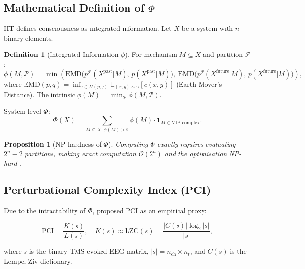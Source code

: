 \documentclass[12pt,a4paper]{article}
\theoremstyle{plain}
\newtheorem{proposition}[theorem]{Proposition}
\theoremstyle{definition}
\newtheorem{definition}[theorem]{Definition}
\theoremstyle{remark}
\newcommand{\PCI}{\mathrm{PCI}}
\newcommand{\E}{\mathbb{E}}
\begin{document}
\subsection{Mathematical Definition of \texorpdfstring{$\Phi$}{Phi}}

IIT \citep{Tononi2004,Tononi2016} defines consciousness as integrated information.
Let $X$ be a system with $n$ binary elements.

\begin{definition}[Integrated Information $\phi$]
For mechanism $M\subseteq X$ and partition $\mathcal{P}$:
\begin{equation}
\phi(M,\mathcal{P}) = \min\!\left(
  \mathrm{EMD}\bigl(p^\mathcal{P}(X^\mathrm{past}|M),\,p(X^\mathrm{past}|M)\bigr),\;
  \mathrm{EMD}\bigl(p^\mathcal{P}(X^\mathrm{future}|M),\,p(X^\mathrm{future}|M)\bigr)
\right),
\label{eq:phi}
\end{equation}
where $\mathrm{EMD}(p,q) = \inf_{\gamma\in\Pi(p,q)}\E_{(x,y)\sim\gamma}[c(x,y)]$
(Earth Mover's Distance). The intrinsic $\phi(M) = \min_\mathcal{P}\phi(M,\mathcal{P})$.

\noindent System-level $\Phi$:
\begin{equation}
\Phi(X) = \sum_{M\subseteq X,\,\phi(M)>0}\phi(M)\cdot\mathbf{1}_{M\in\text{MIP-complex}}.
\label{eq:Phi}
\end{equation}
\end{definition}

\begin{proposition}[NP-hardness of $\Phi$]
Computing $\Phi$ exactly requires evaluating $2^n-2$ partitions, making exact computation
$\mathcal{O}(2^n)$ and the optimisation NP-hard \citep{Aaronson2014}.
\end{proposition}

\subsection{Perturbational Complexity Index (PCI)}

Due to the intractability of $\Phi$, \citet{Casali2013} proposed PCI as an empirical proxy:
\begin{tcolorbox}[mathbox, title={Perturbational Complexity Index}]
\begin{equation}
\PCI = \frac{K(s)}{L(s)},\quad
K(s)\approx\mathrm{LZC}(s) = \frac{|C(s)|\log_2|s|}{|s|},
\label{eq:PCI}
\end{equation}
\end{tcolorbox}
where $s$ is the binary TMS-evoked EEG matrix, $|s|=n_\mathrm{ch}\times n_t$,
and $C(s)$ is the Lempel-Ziv dictionary.
\end{document}
